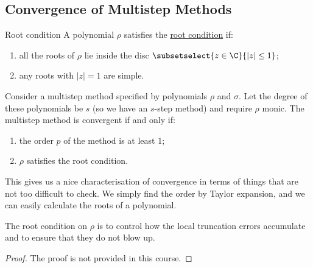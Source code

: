 \documentclass[../Main.tex]{subfiles}
\begin{document}
\subsection{Convergence of Multistep Methods}
\begin{definition}{Root condition}
    A polynomial $\rho$ satisfies the \underline{root condition} if:
    \begin{enumerate}
        \item all the roots of $\rho$ lie inside the disc $\subsetselect{z \in \C}{|z| \leq 1}$;
        \item any roots with $|z| = 1$ are simple.
    \end{enumerate}
\end{definition}
\begin{theorem}
    Consider a multistep method specified by polynomials $\rho$ and $\sigma$. Let the degree of these polynomials be $s$ (so we have an $s$-step method) and require $\rho$ monic. The multistep method is convergent if and only if:
    \begin{enumerate}
        \item the order $p$ of the method is at least 1;
        \item $\rho$ satisfies the root condition.
    \end{enumerate}
    \label{thmDahlquistEquiv}
\end{theorem}
\begin{remarks}
    \item This gives us a nice characterisation of convergence in terms of things that are not too difficult to check. We simply find the order by Taylor expansion, and we can easily calculate the roots of a polynomial.
    \item The root condition on $\rho$ is to control how the local truncation errors accumulate and to ensure that they do not blow up.
\end{remarks}
\begin{proof}
    The proof is not provided in this course.
\end{proof}
\end{document}
